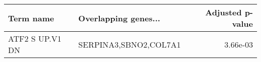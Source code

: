 \begin{tabular}{llr}
\toprule
      Term name &  Overlapping genes... &  Adjusted p-value \\
\midrule
ATF2 S UP.V1 DN & SERPINA3,SBNO2,COL7A1 &          3.66e-03 \\
\bottomrule
\end{tabular}
